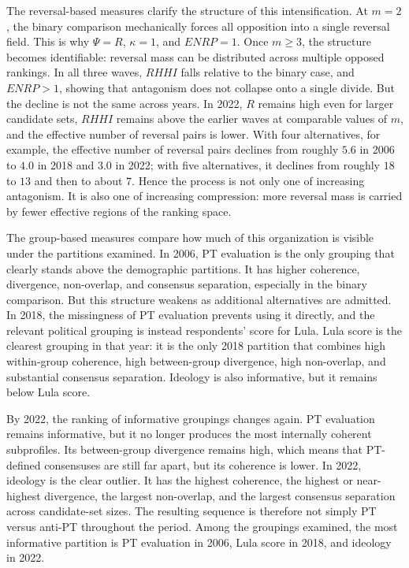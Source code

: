 \documentclass[12pt]{article}
\begin{document}
The reversal-based measures clarify the structure of this intensification.
At \(m=2\), the binary comparison mechanically forces all opposition into a
single reversal field. This is why \(\Psi=R\), \(\kappa=1\), and
\(ENRP=1\). Once \(m\geq 3\), the structure becomes identifiable: reversal
mass can be distributed across multiple opposed rankings. In all three waves,
\(RHHI\) falls relative to the binary case, and \(ENRP>1\), showing that
antagonism does not collapse onto a single divide. But the decline is not the
same across years. In 2022, \(R\) remains high even for larger candidate sets,
\(RHHI\) remains above the earlier waves at comparable values of \(m\), and
the effective number of reversal pairs is lower. With four alternatives, for
example, the effective number of reversal pairs declines from roughly \(5.6\)
in 2006 to \(4.0\) in 2018 and \(3.0\) in 2022; with five alternatives, it
declines from roughly \(18\) to \(13\) and then to about \(7\). Hence the
process is not only one of increasing antagonism. It is also one of increasing
compression: more reversal mass is carried by fewer effective regions of the
ranking space.

The group-based measures compare how much of this organization is visible
under the partitions examined. In 2006, PT evaluation is the only grouping
that clearly stands above the demographic partitions. It has higher coherence,
divergence, non-overlap, and consensus separation, especially in the binary
comparison. But this structure weakens as additional alternatives are admitted.
In 2018, the missingness of PT evaluation prevents using it directly, and the
relevant political grouping is instead respondents' score for Lula. Lula score
is the clearest grouping in that year: it is the only 2018 partition that
combines high within-group coherence, high between-group divergence, high
non-overlap, and substantial consensus separation. Ideology is also informative,
but it remains below Lula score.

By 2022, the ranking of informative groupings changes again. PT evaluation
remains informative, but it no longer produces the most internally coherent
subprofiles. Its between-group divergence remains high, which means that
PT-defined consensuses are still far apart, but its coherence is lower. In
2022, ideology is the clear outlier. It has the highest coherence, the highest
or near-highest divergence, the largest non-overlap, and the largest consensus
separation across candidate-set sizes. The resulting sequence is therefore not
simply PT versus anti-PT throughout the period. Among the groupings examined,
the most informative partition is PT evaluation in 2006, Lula score in 2018,
and ideology in 2022.
\end{document}

